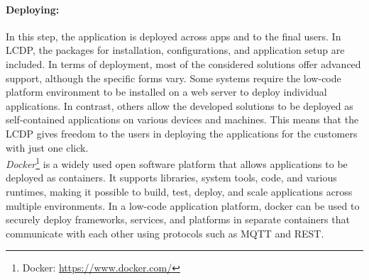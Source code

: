 \paragraph*{Deploying:}
In this step, the application is deployed across apps and to the final users.
In LCDP, the packages for installation, configurations, and application setup are included.
In terms of deployment, most of the considered solutions offer advanced support, although the specific forms vary. 
Some systems require the low-code platform environment to be installed on a web server to deploy individual applications. 
In contrast, others allow the developed solutions to be deployed as self-contained applications on various devices and machines.
This means that the LCDP gives freedom to the users in deploying the applications for the customers with just one click. \\
\textit{Docker}\footnote{Docker: \url{https://www.docker.com/}} is a widely used open software platform that allows applications to be deployed as containers. 
It supports libraries, system tools, code, and various runtimes, making it possible to build, test, deploy, and scale applications across multiple environments. 
In a low-code application platform, docker can be used to securely deploy frameworks, services, and platforms in separate containers that communicate with each other using protocols such as MQTT and REST.

